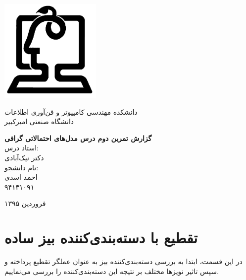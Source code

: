\documentclass[11.5pt,a4paper]{article}
\newcommand{\nocontentsline}[3]{}
\newcommand{\tocless}[2]{\bgroup\let\addcontentsline=\nocontentsline#1{#2}\egroup}
\begin{document}
\thispagestyle{empty}
\vspace*{-28mm}
\centerline{\includegraphics[height=5cm]{Imgs/ceit_logo.png}}

\begin{center}
\vspace{-2mm}
{\LARGE
{
دانشکده مهندسی کامپیوتر و فن‌آوری اطلاعات\\	
دانشگاه صنعتی امیرکبیر	
}
\\[2.1cm]
}

{\large
\textbf{گزارش تمرین دوم درس مدل‌های احتمالاتی گرافی}
\\[2cm]

استاد درس:
\\[.5cm]
{\Large
دکتر نیک‌آبادی}
\\[1.5cm]
\large 
نام دانشجو:
\\[.5cm]
{\Large
احمد اسدی}
\\[.5cm]
۹۴۱۳۱۰۹۱
\\[1.5cm]
}

{\large
فروردین ۱۳۹۵
}
\end{center}

\newpage
\baselineskip=1cm
\tocless\tableofcontents

\newpage
\baselineskip=0.75cm

\section{تقطیع با دسته‌بندی‌کننده بیز ساده}
در این قسمت، ابتدا به بررسی دسته‌بندی‌کننده بیز به عنوان عملگر تقطیع پرداخته و سپس تاثیر نویز‌ها مختلف بر نتیجه این دسته‌بندی‌کننده را بررسی می‌نماییم.
\end{document}
